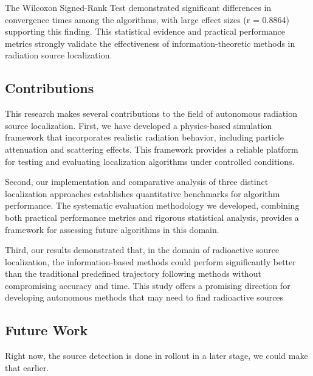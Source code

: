 \documentclass[../report.tex]{subfiles}
\begin{document}
    The Wilcoxon Signed-Rank Test demonstrated significant differences in convergence times among the algorithms, with large effect sizes (r = 0.8864) supporting 
    this finding. This statistical evidence and practical performance metrics strongly validate the effectiveness of information-theoretic methods in radiation 
    source localization.

    \subsection{Contributions}
    \label{sec:conclusions:contributions}

    This research makes several contributions to the field of autonomous radiation source localization. First, we have developed a physics-based 
    simulation framework that incorporates realistic radiation behavior, including particle attenuation and scattering effects. This framework provides a reliable
    platform for testing and evaluating localization algorithms under controlled conditions.

    Second, our implementation and comparative analysis of three distinct localization approaches establishes quantitative benchmarks for algorithm performance. 
    The systematic evaluation methodology we developed, combining both practical performance metrics and rigorous statistical analysis, provides a framework 
    for assessing future algorithms in this domain.

    Third, our results demonstrated that, in the domain of radioactive source localization, the information-based methods could perform significantly better than
    the traditional predefined trajectory following methods without compromising accuracy and time. This study offers a promising direction for developing 
    autonomous methods that may need to find radioactive sources


    \subsection{Future Work}
    \label{sec:conclusions:future_work}

    Right now, the source detection is done in rollout in a later stage, we could make that earlier. 
\end{document}

